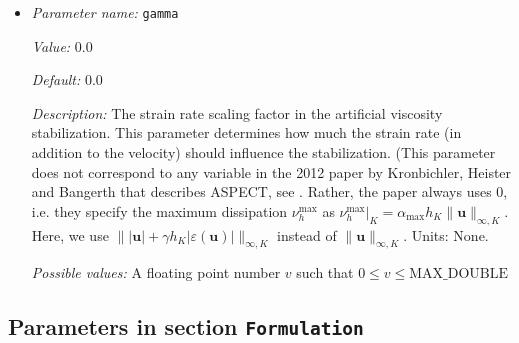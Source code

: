 \begin{itemize}
{\it Value:} 0.33


{\it Default:} 0.33


{\it Description:} The $c_R$ factor in the entropy viscosity stabilization. This parameter controls the part of the entropy viscosity that depends on the solution field itself and its residual in addition to the cell diameter and the maximum velocity in the cell. (For historical reasons, the name used here is different from the one used in the 2012 paper by Kronbichler, Heister and Bangerth that describes ASPECT, see \cite{KHB12}. This parameter corresponds to the factor $\alpha_E$ in the formulas following equation (15) of the paper. After further experiments, we have also chosen to use a different value than described there.) Units: None.


{\it Possible values:} A floating point number $v$ such that $0 \leq v \leq \text{MAX\_DOUBLE}$
\item {\it Parameter name:} {\tt gamma}
\label{parameters:Discretization/Stabilization parameters/gamma}


{\it Value:} 0.0


{\it Default:} 0.0


{\it Description:} The strain rate scaling factor in the artificial viscosity stabilization. This parameter determines how much the strain rate (in addition to the velocity) should influence the stabilization. (This parameter does not correspond to any variable in the 2012 paper by Kronbichler, Heister and Bangerth that describes ASPECT, see \cite{KHB12}. Rather, the paper always uses 0, i.e. they specify the maximum dissipation $\nu_h^\text{max}$ as $\nu_h^\text{max}\vert_K = \alpha_\text{max} h_K \|\mathbf u\|_{\infty,K}$. Here, we use $\|\lvert\mathbf u\rvert + \gamma h_K \lvert\varepsilon (\mathbf u)\rvert\|_{\infty,K}$ instead of $\|\mathbf u\|_{\infty,K}$. Units: None.


{\it Possible values:} A floating point number $v$ such that $0 \leq v \leq \text{MAX\_DOUBLE}$
\end{itemize}

\subsection{Parameters in section \tt Formulation}
\label{parameters:Formulation}

